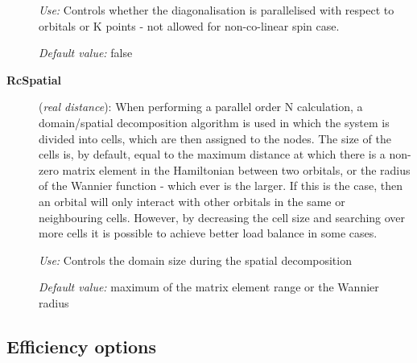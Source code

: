 \documentclass[11pt]{article}
\begin{document}
\begin{description}
{\it Use:} Controls whether the diagonalisation is parallelised with
respect to orbitals or K points - not allowed for non-co-linear spin
case.

{\it Default value:}  false

\item[{\bf RcSpatial}] ({\it real distance}):
When performing a parallel order N calculation, a domain/spatial
decomposition algorithm is used in which the system is divided into
cells, which are then assigned to the nodes. The size of the cells
is, by default, equal to the maximum distance at which there is a non-zero 
matrix element in the Hamiltonian between two orbitals, or the
radius of the Wannier function - which ever is the larger. If this is 
the case, then an orbital will only interact with other orbitals in the same
or neighbouring cells. However, by decreasing the cell size and searching
over more cells it is possible to achieve better load balance in some
cases.

{\it Use:} Controls the domain size during the spatial decomposition

{\it Default value:}  maximum of the matrix element range or the Wannier radius

\end{description}


\vspace{5pt}
\subsection{Efficiency options}
\end{document}
